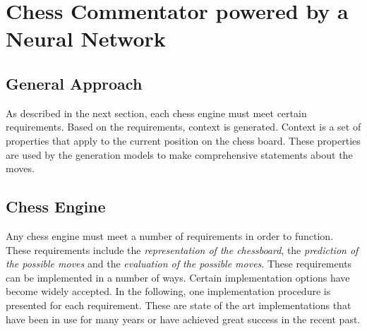 \section{Chess Commentator powered by a Neural Network}

\subsection{General Approach}


As described in the next section, each chess engine must meet certain requirements. Based on the requirements, context is generated. Context is a set of properties that apply to the current position on the chess board. These properties are used by the generation models to make comprehensive statements about the moves.


\subsection{Chess Engine}

Any chess engine must meet a number of requirements in order to function. These requirements include the \textit{representation of the chessboard}, the \textit{prediction of the possible moves} and the \textit{evaluation of the possible moves}. These requirements can be implemented in a number of ways. Certain implementation options have become widely accepted. In the following, one implementation procedure is presented for each requirement. These are state of the art implementations that have been in use for many years or have achieved great success in the recent past. 






